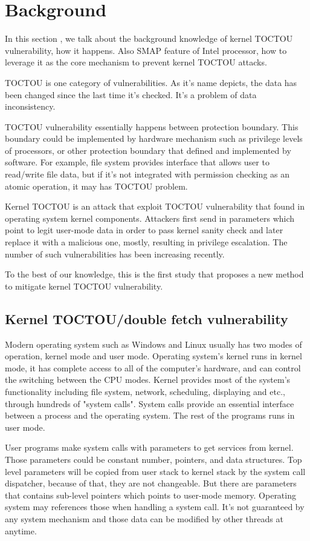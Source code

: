 \section{Background}

In this section , we talk about the background knowledge of kernel TOCTOU vulnerability, how it happens. Also SMAP feature of Intel processor, how to leverage it as the core mechanism to prevent kernel TOCTOU attacks.  

TOCTOU is one category of vulnerabilities. As it's name depicts, the data has been changed since the last time it's checked. It's a problem of data inconsistency.

TOCTOU vulnerability essentially happens between protection boundary. This boundary could be implemented by hardware mechanism such as privilege levels of processors, or other protection boundary that defined and implemented by software. For example, file system provides interface that allows user to read/write file data, but if it's not integrated with  permission checking as an atomic operation, it may has TOCTOU problem.

Kernel TOCTOU is an attack that exploit TOCTOU vulnerability that found in operating system kernel components. Attackers first send in parameters which point to legit user-mode data in order to pass kernel sanity check and later replace it with a malicious one, mostly, resulting in privilege escalation. The number of such vulnerabilities has been increasing recently.

To the best of our knowledge, this is the first study that proposes a new method to mitigate kernel TOCTOU vulnerability. 

\subsection{Kernel TOCTOU/double fetch vulnerability}

Modern operating system such as Windows and Linux usually has two modes of operation, kernel mode and user mode. Operating system's kernel runs in kernel mode, it has complete access to all of the computer's hardware, and can control the switching between the CPU modes. Kernel provides most of the system's functionality including file system, network, scheduling, displaying and etc., through hundreds of "system calls". System calls provide an essential interface between a process and the operating system. The rest of the programs runs in user mode. 

User programs make system calls with parameters to get services from kernel. Those parameters could be constant number, pointers, and data structures. Top level parameters will be copied from user stack to kernel stack by the system call dispatcher, because of that, they are not changeable. But there are parameters that contains sub-level pointers which points to user-mode memory. Operating system may references those when handling a system call. It's not guaranteed by any system mechanism and those data can be modified by other threads at anytime.

